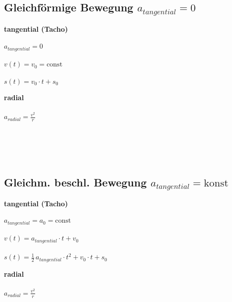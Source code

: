	\subsection{Gleichförmige Bewegung $a_{tangential} = 0$}
	
		\begin{minipage}{0.6\linewidth}
			\textbf{tangential (Tacho)} \\
				\\
				$a_{tangential} = 0$ \\
				\\
				$v(t) = v_0 = \text{const}$ \\
				\\
				$s(t) = v_0 \cdot t + s_0$ \\
		\end{minipage}
		\hfill
		\begin{minipage}{0.35\linewidth}
			\textbf{radial} \\
				\\
				$a_{radial} = \frac{v^2}{r}$ \\
				\\
				\\
				\\
				\\
		\end{minipage}

	\subsection{Gleichm. beschl. Bewegung $a_{tangential} = \text{konst}$}		
		\begin{minipage}{0.6\linewidth}
			\textbf{tangential (Tacho)} \\
				\\
				$a_{tangential} = a_0 = \text{const}$ \\
				\\
				$v(t) = a_{tangential} \cdot t + v_0 $ \\
				\\
				$s(t) = \frac{1}{2} \, a_{tangential} \cdot t^2 +  v_0 \cdot t + s_0$ \\
		\end{minipage}
		\hfill
		\begin{minipage}{0.35\linewidth}
			\textbf{radial} \\
				\\
				$a_{radial} = \frac{v^2}{r}$ \\
				\\
				\\
				\\
				\\
		\end{minipage}

